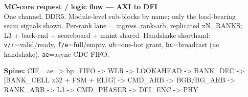 \documentclass[9pt]{extarticle}
\begin{document}
\begin{center}
{\LARGE\textbf{MC-core request / logic flow --- AXI to DFI}}\\[2pt]
{\small One channel, DDR5. Module-level sub-blocks by name; only the load-bearing seam signals shown.
Per-rank lane = ingress..rank-arb, replicated xN_RANKS; L3 + back-end + scoreboard + maint shared.
Handshake shorthand: \texttt{v/r}=valid/ready, \texttt{f/e}=full/empty, \texttt{oh}=one-hot grant,
\texttt{bc}=broadcast (no handshake), \texttt{ae}=async CDC FIFO.}
\end{center}

\noindent\textbf{Spine:}\quad
{\ttfamily\footnotesize CIF =ae=> bp\_FIFO -> WLR -> LOOKAHEAD -> BANK\_DEC -> [BANK\_CELL x32 + FSM + ELIG]
-> CMD\_ARB -> BGB/BG\_ARB -> RANK\_ARB -> L3 -> CMD\_PHASER -> DFI\_ENC -> PHY}
\end{document}
